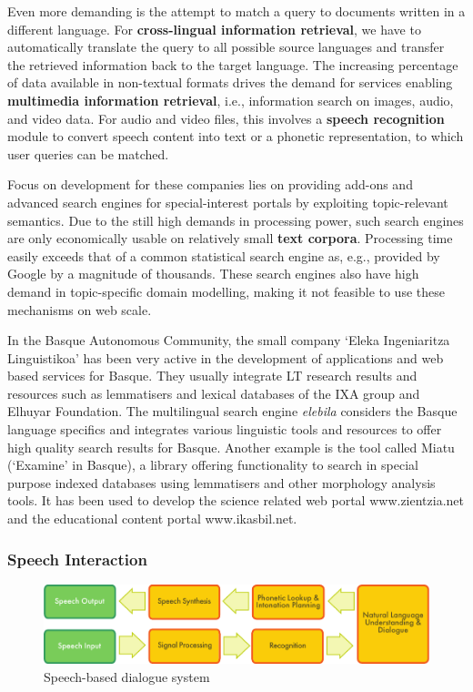 \begin{multicols}{2}
Even more demanding is the attempt to match a query to documents written in a different language. For \textbf{cross-lingual information retrieval}, we have to automatically translate the query to all possible source languages and transfer the retrieved information back to the target language. The increasing percentage of data available in non-textual formats drives the demand for services enabling \textbf{multimedia information retrieval}, i.e., information search on images, audio, and video data. For audio and video files, this involves a \textbf{speech recognition} module to convert speech content into text or a phonetic representation, to which user queries can be matched.

Focus on development for these companies lies on providing add-ons and advanced search engines for special-interest portals by exploiting topic-relevant semantics. Due to the still high demands in processing power, such search engines are only economically usable on relatively small \textbf{text corpora}. Processing time easily exceeds that of a common statistical search engine as, e.g., provided by Google by a magnitude of thousands. These search engines also have high demand in topic-specific domain modelling, making it not feasible to use these mechanisms on web scale.

In the Basque Autonomous Community, the small company ‘Eleka Ingeniaritza Linguistikoa’ has been very active in the development of applications and web based services for Basque. They usually integrate LT research results and resources such as lemmatisers and lexical databases of the IXA group and Elhuyar Foundation. The multilingual search engine \textit{elebila} considers the Basque language specifics and integrates various linguistic tools and resources to offer high quality search results for Basque. Another example is the tool called Miatu (‘Examine’ in Basque), a library offering functionality to search in special purpose indexed databases using lemmatisers and other morphology analysis tools. It has been used to develop the science related web portal www.zientzia.net and the educational content portal www.ikasbil.net.

\subsubsection{Speech Interaction}
\begin{figure}[htb]
  \center
  \includegraphics[width=\textwidth]{../_media/english/simple_speech-based_dialogue_architecture}
  \caption{Speech-based dialogue system}
  \label{fig:dialoguearch_en}
\end{figure}


\end{multicols}
